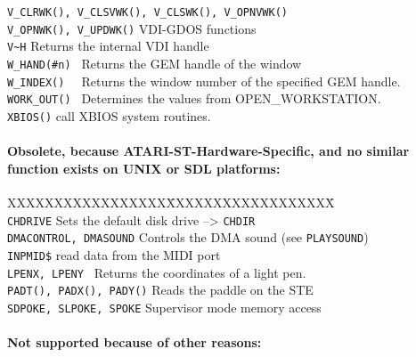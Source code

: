 \begin{tabbing}
\verb|V_CLRWK(), V_CLSVWK(), V_CLSWK(), V_OPNVWK()|	\\
\verb|V_OPNWK(), V_UPDWK()|\> VDI-GDOS functions\\
\verb|V~H|\>	       	Returns the internal VDI handle\\
\verb|W_HAND(#n) |\>    	Returns the GEM handle of the window\\
\verb|W_INDEX()  |\>    	Returns the window number of the specified GEM handle.\\
\verb|WORK_OUT() |\>    	Determines the values from OPEN\_WORKSTATION.\\
\verb|XBIOS()|\>	       	call XBIOS system routines.\\

\end{tabbing}

\paragraph{Obsolete, because ATARI-ST-Hardware-Specific, and no similar function
exists on UNIX or SDL platforms:}

\begin{tabbing}
XXXXXXXXXXXXXXXXX\=XXXXXXXXXXXXXXXXXX\=\kill\\
\verb|CHDRIVE|\>	Sets the default disk drive --> \verb|CHDIR|\\
\verb|DMACONTROL, DMASOUND|\>     Controls the DMA sound (see \verb|PLAYSOUND|)\\
\verb|INPMID$|\>        	read data from the MIDI port\\
\verb|LPENX, LPENY |\>   Returns the coordinates of a light pen.\\
\verb|PADT(), PADX(), PADY()|\> Reads the paddle on the STE\\
\verb|SDPOKE, SLPOKE, SPOKE|\>  Supervisor mode memory access\\

\end{tabbing}

\paragraph{Not supported because of other reasons:}

